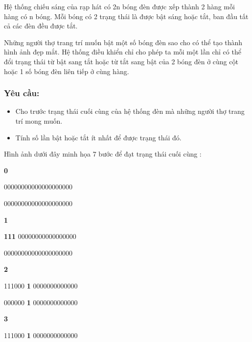 



   Hệ thống chiếu sáng của rạp hát có 2n bóng đèn được xếp thành 2 hàng mỗi hàng có n bóng. Mỗi bóng có 2 trạng thái là được bật sáng hoặc tắt, ban đầu tất cả các đèn đều được tắt.  

   Những người thợ trang trí muốn bật một số bóng đèn sao cho có thể tạo thành hình ảnh đẹp mắt. Hệ thống điều khiển chỉ cho phép ta mỗi một lần chỉ có thể đổi trạng thái từ bật sang tắt hoặc từ tắt sang bật của 2 bóng đèn ở cùng cột hoặc 1 số bóng đèn liên tiếp ở cùng hàng.  

\subsubsection{   Yêu cầu:  }
\begin{itemize}
	\item     Cho trước trạng thái cuối cùng của hệ thống đèn mà những người thợ trang trí mong muốn.   
	\item     Tính số lần bật hoặc tắt ít nhất để được trạng thái đó.   
\end{itemize}









   Hình ảnh dưới đây minh họa 7 bước để đạt trạng thái cuối cùng :  



\textbf{          0         }

         00000000000000000000                          

         00000000000000000000                          

\textbf{          1         }

\textbf{          111         }         00000000000000000                          

         00000000000000000000                          

\textbf{          2         }

         111000         \textbf{          1         }         0000000000000                          

         000000         \textbf{          1         }         0000000000000                          

\textbf{          3         }

         111000         \textbf{          1         }         0000000000000        

